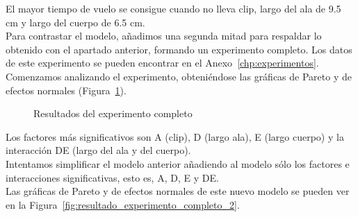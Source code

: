 \documentclass[12pt,a4paper,twoside,openright,titlepage,final]{article}
\begin{document}
El mayor tiempo de vuelo se consigue cuando no lleva clip, largo del ala de 9.5 cm y largo del cuerpo de 6.5 cm.\\

Para contrastar el modelo, añadimos una segunda mitad para respaldar lo obtenido con el apartado anterior, formando un experimento completo.  Los datos de este experimento se pueden encontrar en el Anexo~\ref{chp:experimentos}.\\

Comenzamos analizando el experimento, obteniéndose las gráficas de Pareto y de efectos normales (Figura~\ref{fig:resultado_experimento_completo_1}).\\

\begin{figure}[htbp!]
	\centering
	\caption{Resultados del experimento completo} \label{fig:resultado_experimento_completo_1}
\end{figure}

Los factores más significativos son A (clip), D (largo ala), E (largo cuerpo) y la interacción DE (largo del ala y del cuerpo).\\

Intentamos simplificar el modelo anterior añadiendo al modelo sólo los factores e interacciones significativas, esto es, A, D, E y DE.\\

Las gráficas de Pareto y de efectos normales de este nuevo modelo se pueden ver en la Figura~\ref{fig:resultado_experimento_completo_2}.\\
\end{document}
